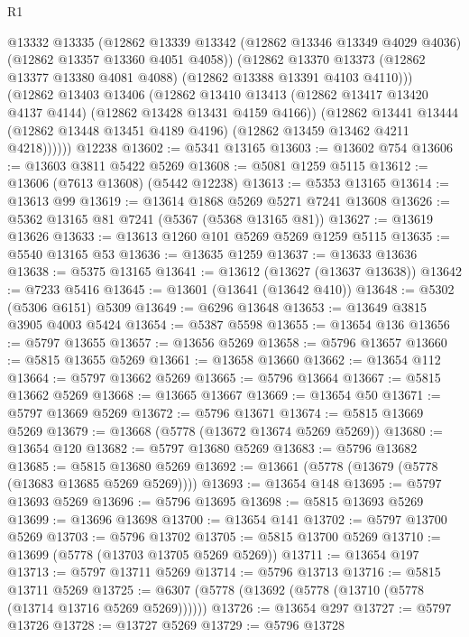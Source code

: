 \begin{lexlean}{R1}
\begin{coremodule}
            @13332
            @13335
            (@12862
              @13339
              @13342
              (@12862 @13346 @13349 @4029 @4036)
              (@12862 @13357 @13360 @4051 @4058))
            (@12862
              @13370
              @13373
              (@12862 @13377 @13380 @4081 @4088)
              (@12862 @13388 @13391 @4103 @4110)))
          (@12862
            @13403
            @13406
            (@12862
              @13410
              @13413
              (@12862 @13417 @13420 @4137 @4144)
              (@12862 @13428 @13431 @4159 @4166))
            (@12862
              @13441
              @13444
              (@12862 @13448 @13451 @4189 @4196)
              (@12862 @13459 @13462 @4211 @4218))))))
    @12238
@13602 := @5341 @13165
@13603 := @13602 @754
@13606 := @13603 @3811 @5422 @5269
@13608 := @5081 @1259 @5115
@13612 := @13606 (@7613 @13608) (@5442 @12238)
@13613 := @5353 @13165
@13614 := @13613 @99
@13619 := @13614 @1868 @5269 @5271 @7241 @13608
@13626 := @5362 @13165 @81 @7241 (@5367 (@5368 @13165 @81))
@13627 := @13619 @13626
@13633 := @13613 @1260 @101 @5269 @5269 @1259 @5115
@13635 := @5540 @13165 @53
@13636 := @13635 @1259
@13637 := @13633 @13636
@13638 := @5375 @13165
@13641 := @13612 (@13627 (@13637 @13638))
@13642 := @7233 @5416
@13645 := @13601 (@13641 (@13642 @410))
@13648 := @5302 (@5306 @6151) @5309
@13649 := @6296 @13648
@13653 := @13649 @3815 @3905 @4003 @5424
@13654 := @5387 @5598
@13655 := @13654 @136
@13656 := @5797 @13655
@13657 := @13656 @5269
@13658 := @5796 @13657
@13660 := @5815 @13655 @5269
@13661 := @13658 @13660
@13662 := @13654 @112
@13664 := @5797 @13662 @5269
@13665 := @5796 @13664
@13667 := @5815 @13662 @5269
@13668 := @13665 @13667
@13669 := @13654 @50
@13671 := @5797 @13669 @5269
@13672 := @5796 @13671
@13674 := @5815 @13669 @5269
@13679 := @13668 (@5778 (@13672 @13674 @5269 @5269))
@13680 := @13654 @120
@13682 := @5797 @13680 @5269
@13683 := @5796 @13682
@13685 := @5815 @13680 @5269
@13692 := @13661 (@5778 (@13679 (@5778 (@13683 @13685 @5269 @5269))))
@13693 := @13654 @148
@13695 := @5797 @13693 @5269
@13696 := @5796 @13695
@13698 := @5815 @13693 @5269
@13699 := @13696 @13698
@13700 := @13654 @141
@13702 := @5797 @13700 @5269
@13703 := @5796 @13702
@13705 := @5815 @13700 @5269
@13710 := @13699 (@5778 (@13703 @13705 @5269 @5269))
@13711 := @13654 @197
@13713 := @5797 @13711 @5269
@13714 := @5796 @13713
@13716 := @5815 @13711 @5269
@13725 := @6307 (@5778 (@13692 (@5778 (@13710 (@5778 (@13714 @13716 @5269 @5269))))))
@13726 := @13654 @297
@13727 := @5797 @13726
@13728 := @13727 @5269
@13729 := @5796 @13728

\end{coremodule}
\end{lexlean}
